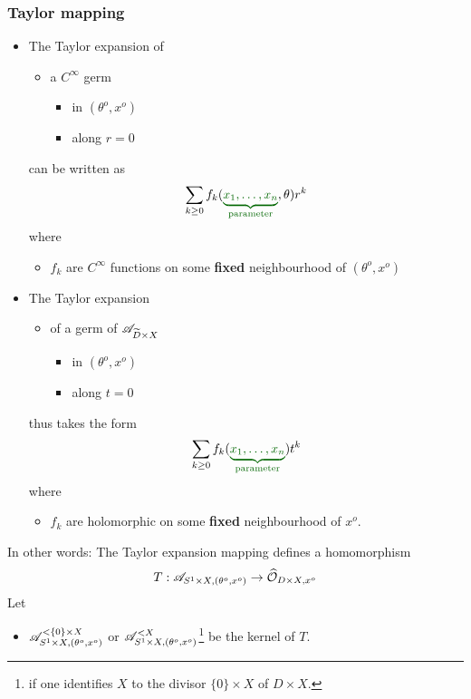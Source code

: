 \subsubsection{Taylor mapping}
\begin{itemize}
  \item The Taylor expansion of
    \begin{itemize}
      \item a $C^\infty$ germ
        \begin{itemize}
          \item in $(\theta^o,x^o)$
          \item along $r=0$
        \end{itemize}
    \end{itemize}
    can be written as
    \[
      \sum_{k\geq0}f_k(\textcolor{green!40!black}{\underset{\text{parameter}}
        {\underbrace{x_1,\ldots,x_n}}},\theta)r^k
    \]
    where
    \begin{itemize}
      \item $f_k$ are $C^\infty$ functions on some \textbf{fixed}
        neighbourhood of $(\theta^o,x^o)$
    \end{itemize}
  \item The Taylor expansion
    \begin{itemize}
      \item of a germ of $\mathscr{A}_{\widetilde D\times X}$
        \begin{itemize}
          \item in $(\theta^o,x^o)$
          \item along $t=0$
        \end{itemize}
    \end{itemize}
    thus takes the form
    \[
      \sum_{k\geq0}f_k(\textcolor{green!40!black}{\underset{\text{parameter}}
        {\underbrace{x_1,\ldots,x_n}}})t^k
    \]
    where
    \begin{itemize}
      \item $f_k$ are holomorphic on some \textbf{fixed} neighbourhood of
        $x^o$.
    \end{itemize}
\end{itemize}
In other words: The Taylor expansion mapping defines a homomorphism
\[
  T:\mathscr{A}_{S^1\times X,(\theta^o,x^o)}\to\widehat{\mathcal{O}}_{D\times X,x^o}
\]
Let
\begin{itemize}
  \item $\mathscr{A}_{S^1\times X,(\theta^o,x^o)}^{<\{0\}\times X}$ or
    $\mathscr{A}_{S^1\times X,(\theta^o,x^o)}^{<X}$\footnote{if one identifies $X$ to
    the divisor $\{0\}\times X$ of $D\times X$.} be the kernel of $T$.
\end{itemize}

